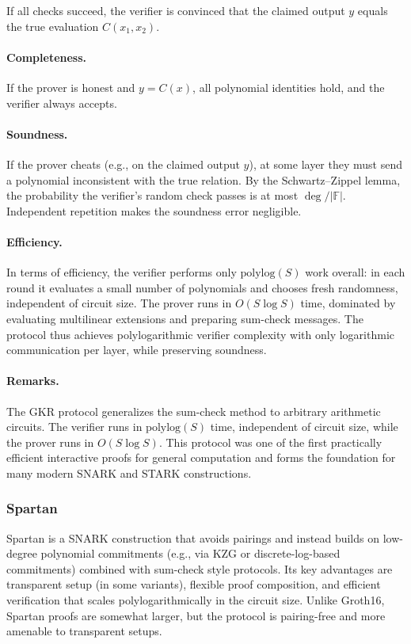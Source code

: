 If all checks succeed, the verifier is convinced that the claimed output $y$ equals the true evaluation $C(x_1,x_2)$.


\paragraph{Completeness.}
If the prover is honest and $y = C(x)$, all polynomial identities hold, and the verifier always accepts.

\paragraph{Soundness.}
If the prover cheats (e.g., on the claimed output $y$), at some layer they must send a polynomial inconsistent with the true relation. 
By the Schwartz–Zippel lemma, the probability the verifier’s random check passes is at most $\deg/|\mathbb{F}|$. 
Independent repetition makes the soundness error negligible.

\paragraph{Efficiency.}
In terms of efficiency, the verifier performs only $\mathrm{polylog}(S)$ work overall: in each round it evaluates a small number of polynomials and chooses fresh randomness, independent of circuit size. 
The prover runs in $O(S \log S)$ time, dominated by evaluating multilinear extensions and preparing sum-check messages. 
The protocol thus achieves polylogarithmic verifier complexity with only logarithmic communication per layer, while preserving soundness.

\paragraph{Remarks.}
The GKR protocol generalizes the sum-check method to arbitrary arithmetic circuits. 
The verifier runs in $\mathrm{polylog}(S)$ time, independent of circuit size, while the prover runs in $O(S \log S)$. 
This protocol was one of the first practically efficient interactive proofs for general computation and forms the foundation for many modern SNARK and STARK constructions.

\subsubsection{Spartan}

Spartan \cite{setty2020spartan} is a SNARK construction that avoids pairings and instead builds on 
low-degree polynomial commitments (e.g., via KZG or discrete-log-based commitments) combined with 
sum-check style protocols.  
Its key advantages are transparent setup (in some variants), flexible proof composition, 
and efficient verification that scales polylogarithmically in the circuit size.  
Unlike Groth16, Spartan proofs are somewhat larger, but the protocol is pairing-free 
and more amenable to transparent setups.

